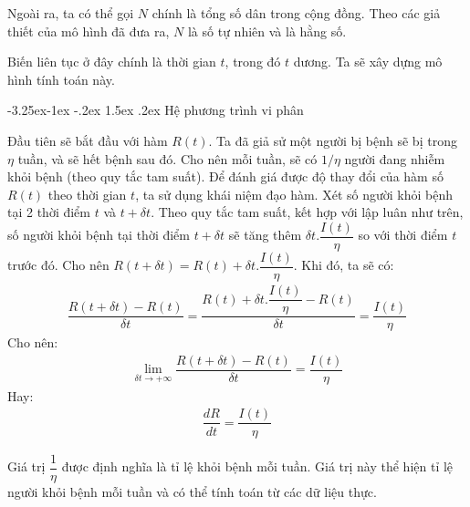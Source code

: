 \documentclass[a4paper]{article}
\makeatletter
\newcounter {subsubsubsection}[subsubsection]
\newcommand\subsubsubsection{\@startsection{subsubsubsection}{4}{\z@}%
                                     {-3.25ex\@plus -1ex \@minus -.2ex}%
                                     {1.5ex \@plus .2ex}%
                                     {\normalfont\normalsize\bfseries}}
\makeatother
\begin{document}
Ngoài ra, ta có thể gọi $N$ chính là tổng số dân trong cộng đồng. Theo các giả thiết của mô hình đã đưa ra, $N$ là số tự nhiên và là hằng số.

Biến liên tục ở đây chính là thời gian $t$, trong đó $t$ dương. Ta sẽ xây dựng mô hình tính toán này.

\subsubsubsection{Hệ phương trình vi phân}

Đầu tiên sẽ bắt đầu với hàm $R(t)$. Ta đã giả sử một người bị bệnh sẽ bị trong $\eta$ tuần, và sẽ hết bệnh sau đó. Cho nên mỗi tuần, sẽ có $1/\eta $ người đang nhiễm khỏi bệnh (theo quy tắc tam suất).
Để đánh giá được độ thay đổi của hàm số $R(t)$ theo thời gian $t$, ta sử dụng khái niệm đạo hàm. Xét số người khỏi bệnh tại 2 thời điểm $t$ và $t +\delta t$. Theo quy tắc tam suất, kết hợp với lập luân như trên, số người khỏi bệnh tại thời điểm $t+ \delta t$ sẽ tăng thêm $\delta t.\dfrac{I(t)}{\eta}$ so với thời điểm $t$ trước đó. Cho nên $R(t+\delta t) = R(t) +\delta t.\dfrac{I(t)}{\eta}$. Khi đó, 
ta sẽ có: 
\begin{align*}
    \dfrac{R(t + \delta t) - R(t)}{\delta t} = \dfrac {R(t) +\delta t.\dfrac{I(t)}{\eta} - R(t)}{\delta t} = \dfrac{I(t)}{\eta}
\end{align*}
Cho nên:
\begin{align*}
    \lim_{\delta t\rightarrow +\infty} \dfrac{R(t + \delta t) - R(t)}{\delta t} = \dfrac{I(t)}{\eta}
\end{align*}
Hay: 
\begin{align*}
    \dfrac{dR}{dt} = \dfrac{I(t)}{\eta}
\end{align*}

Giá trị $\dfrac{1}{\eta}$ được định nghĩa là tỉ lệ khỏi bệnh mỗi tuần. Giá trị này thể hiện tỉ lệ người khỏi bệnh mỗi tuần và có thể tính toán từ các dữ liệu thực. 
\end{document}
